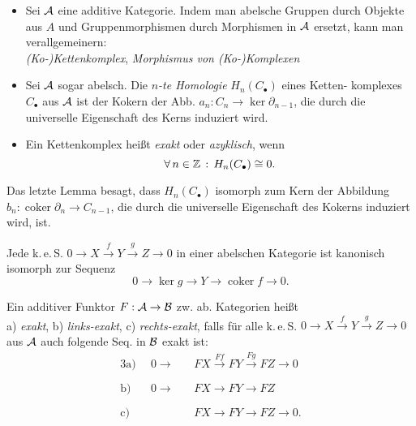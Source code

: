 \documentclass{cheat-sheet}
\newcommand{\CC}[1]{{#1}_{\bullet}} %
\newcommand{\keS}{k.\,e.\,S.} %
\DeclareMathOperator{\coker}{coker} %
\begin{document}

\begin{defn}
  \begin{itemize}
    \item Sei $\mathcal{A}$ eine additive Kategorie. Indem man abelsche Gruppen durch Objekte aus $A$ und Gruppenmorphismen durch Morphismen in $\mathcal{A}$ ersetzt, kann man verallgemeinern: \\
    \emph{(Ko-)Kettenkomplex}, \emph{Morphismus von (Ko-)Komplexen}
    \item Sei $\mathcal{A}$ sogar abelsch. Die \emph{$n$-te Homologie} $H_n(\CC{C})$ eines Ketten- komplexes $\CC{C}$ aus $\mathcal{A}$ ist der Kokern der Abb. $a_n : C_n \to \ker \partial_{n-1}$, die durch die universelle Eigenschaft des Kerns induziert wird. \\
    \item Ein Kettenkomplex heißt \emph{exakt} oder \emph{azyklisch}, wenn
    \[ \fa{n \in \Z} H_n(\CC{C}) \cong 0. \]
  \end{itemize}
\end{defn}

\begin{bem}
  Das letzte Lemma besagt, dass $H_n(\CC{C})$ isomorph zum Kern der Abbildung $b_n : \coker \partial_n \to C_{n-1}$, die durch die universelle Eigenschaft des Kokerns induziert wird, ist.
\end{bem}

\begin{lem}
  Jede \keS{} $0 \to X \xrightarrow{f} Y \xrightarrow{g} Z \to 0$ in einer abelschen Kategorie ist kanonisch isomorph zur Sequenz
  \[ 0 \to \ker g \to Y \to \coker f \to 0. \]
\end{lem}

\begin{defn}
  Ein additiver Funktor $F : \mathcal{A} \to \mathcal{B}$ zw. ab. Kategorien heißt \\
  a) \emph{exakt}, b) \emph{links-exakt}, c) \emph{rechts-exakt}, falls für alle \keS{}
  $0 \to X \xrightarrow{f} Y \xrightarrow{g} Z \to 0$
  aus $\mathcal{A}$ auch folgende Seq. in $\mathcal{B}$ exakt ist:
  \begin{alignat*}{3}
    \text{a)} \enspace & 0 \to &&\, FX \xrightarrow{Ff} FY \xrightarrow{Fg} FZ \to 0 \\[-5pt]
    \text{b)} \enspace & 0 \to &&\, FX \xrightarrow{\phantom{Ff}} FY \xrightarrow{\phantom{Fg}} FZ \\[-5pt]
    \text{c)} \enspace & &&\, FX \xrightarrow{\phantom{Ff}} FY \xrightarrow{\phantom{Fg}} FZ \to 0.
  \end{alignat*}
\end{defn}
\end{document}
